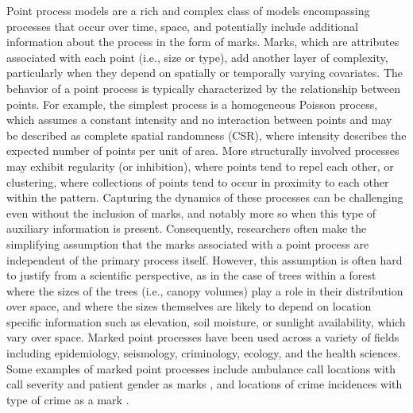 Point process models are a rich and complex class of models encompassing
processes that occur over time, space, and potentially include
additional information about the process in the form of marks. Marks,
which are attributes associated with each point (i.e., size or type),
add another layer of complexity, particularly when they depend on
spatially or temporally varying covariates. The behavior of a point
process is typically characterized by the relationship between points.
For example, the simplest process is a homogeneous Poisson process,
which assumes a constant intensity and no interaction between points and
may be described as complete spatial randomness (CSR), where intensity
describes the expected number of points per unit of area. More
structurally involved processes may exhibit regularity (or inhibition),
where points tend to repel each other, or clustering, where collections
of points tend to occur in proximity to each other within the pattern.
Capturing the dynamics of these processes can be challenging even
without the inclusion of marks, and notably more so when this type of
auxiliary information is present. Consequently, researchers often make
the simplifying assumption that the marks associated with a point
process are independent of the primary process itself. However, this
assumption is often hard to justify from a scientific perspective, as in
the case of trees within a forest where the sizes of the trees (i.e.,
canopy volumes) play a role in their distribution over space, and where
the sizes themselves are likely to depend on location specific
information such as elevation, soil moisture, or sunlight availability,
which vary over space. Marked point processes have been used across a
variety of fields including epidemiology, seismology, criminology,
ecology, and the health sciences. Some examples of marked point
processes include ambulance call locations with call severity and
patient gender as marks \citep{bayisaRegularisedSemiparametricComposite2023},
and locations of crime incidences with type of crime as a mark
\citep{mohlerSelfExcitingPointProcess2011}.

